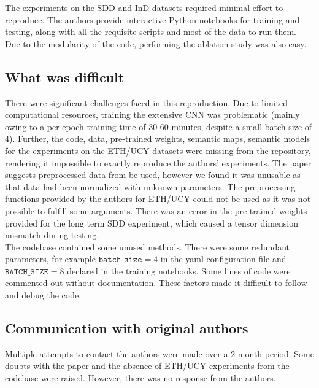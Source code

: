 The experiments on the SDD and InD datasets required minimal effort to reproduce. The authors provide interactive Python notebooks for training and testing, along with all the requisite scripts and most of the data to run them. Due to the modularity of the code, performing the ablation study was also easy.

\subsection{What was difficult}

There were significant challenges faced in this reproduction. Due to limited computational resources, training the extensive CNN was problematic (mainly owing to a per-epoch training time of 30-60 minutes, despite a small batch size of 4). Further, the code, data, pre-trained weights, semantic maps, semantic models for the experiments on the ETH/UCY datasets were missing from the repository, rendering it impossible to exactly reproduce the authors' experiments. The paper suggests preprocessed data from \cite{DBLP:journals/corr/abs-1803-10892} be used, however we found it was unusable as that data had been normalized with unknown parameters. The preprocessing functions provided by the authors for ETH/UCY could not be used as it was not possible to fulfill some arguments. There was an error in the pre-trained weights provided for the long term SDD experiment, which caused a tensor dimension mismatch during testing.\\ The codebase contained some unused methods. There were some redundant parameters, for example $\mathtt{batch\_ size} = 4$ in the yaml configuration file and $\mathtt{BATCH\_ SIZE} = 8$ declared in the training notebooks. Some lines of code were commented-out without documentation. These factors made it difficult to follow and debug the code.


\subsection{Communication with original authors}
 
Multiple attempts to contact the authors were made over a 2 month period. Some doubts with the paper and the absence of ETH/UCY experiments from the codebase were raised. However, there was no response from the authors.
